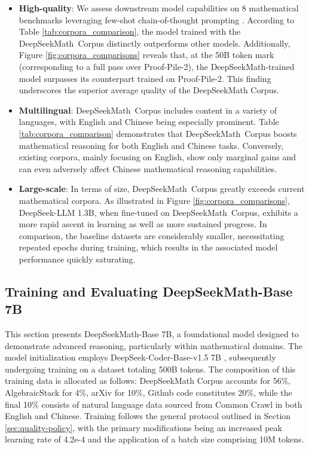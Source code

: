 \begin{itemize}[topsep=0pt]
\begin{itemize}[topsep=0pt]
    \item \textbf{High-quality}:
    We assess downstream model capabilities on 8 mathematical benchmarks leveraging few-shot chain-of-thought prompting \cite{cot}. According to Table \ref{tab:corpora_comparison}, the model trained with the DeepSeekMath~Corpus distinctly outperforms other models. Additionally, Figure \ref{fig:corpora_comparisons} reveals that, at the 50B token mark (corresponding to a full pass over Proof-Pile-2), the DeepSeekMath-trained model surpasses its counterpart trained on Proof-Pile-2. This finding underscores the superior average quality of the DeepSeekMath Corpus.
    \item \textbf{Multilingual}:
    DeepSeekMath~Corpus includes content in a variety of languages, with English and Chinese being especially prominent. Table \ref{tab:corpora_comparison} demonstrates that DeepSeekMath~Corpus boosts mathematical reasoning for both English and Chinese tasks. Conversely, existing corpora, mainly focusing on English, show only marginal gains and can even adversely affect Chinese mathematical reasoning capabilities.
    \item \textbf{Large-scale}:
    In terms of size, DeepSeekMath~Corpus greatly exceeds current mathematical corpora. As illustrated in Figure \ref{fig:corpora_comparisons}, DeepSeek-LLM 1.3B, when fine-tuned on DeepSeekMath~Corpus, exhibits a more rapid ascent in learning as well as more sustained progress. In comparison, the baseline datasets are considerably smaller, necessitating repeated epochs during training, which results in the associated model performance quickly saturating.
\end{itemize}

\subsection{Training and Evaluating DeepSeekMath-Base 7B}

This section presents DeepSeekMath-Base 7B, a foundational model designed to demonstrate advanced reasoning, particularly within mathematical domains. The model initialization employs DeepSeek-Coder-Base-v1.5 7B \citep{deepseek-coder}, subsequently undergoing training on a dataset totaling 500B tokens. The composition of this training data is allocated as follows: DeepSeekMath Corpus accounts for 56\%, AlgebraicStack for 4\%, arXiv for 10\%, Github code constitutes 20\%, while the final 10\% consists of natural language data sourced from Common Crawl in both English and Chinese. Training follows the general protocol outlined in Section \ref{sec:quality-policy}, with the primary modifications being an increased peak learning rate of 4.2e-4 and the application of a batch size comprising 10M tokens.


\end{itemize}
